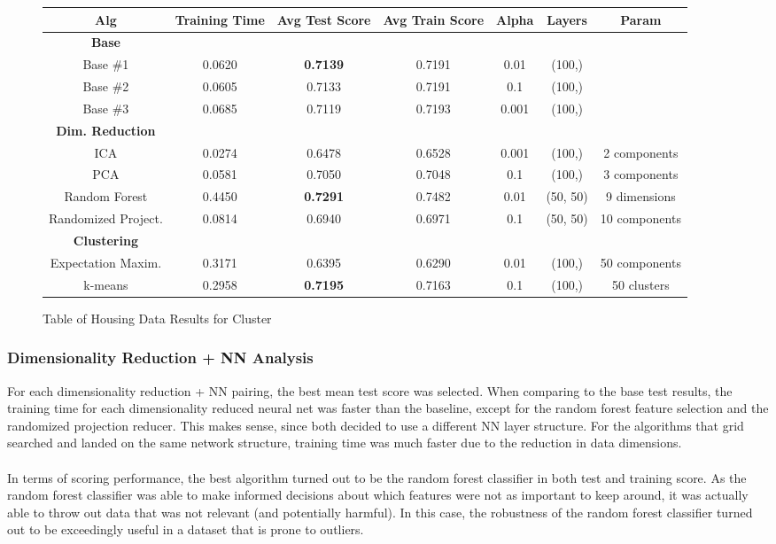 \documentclass[h]{article}
\begin{document}
\begin{figure}[H] 
\begin{tabular}{ | c | c  | c | c | c | c | c | } 
\hline
\textbf{ Alg } & \textbf{ Training Time } & \textbf{ Avg Test Score} & \textbf{ Avg Train Score } & \textbf{Alpha} & \textbf{Layers} & \textbf{Param}    \\
\hline
\textbf{Base} \\ \hline
Base \#1 & 0.0620 & \textbf{0.7139} & 0.7191 & 0.01 & (100,) \\ \hline 
Base \#2 & 0.0605 & 0.7133 & 0.7191 & 0.1 & (100,) \\ \hline 
Base \#3 & 0.0685 & 0.7119 & 0.7193 & 0.001 & (100,) \\ \hline 
\textbf{Dim. Reduction} \\ \hline
ICA & 0.0274 & 0.6478 & 0.6528 & 0.001 & (100,) & 2 components \\ \hline
PCA & 0.0581 & 0.7050 & 0.7048 & 0.1 & (100,) & 3 components \\ \hline
Random Forest & 0.4450 & \textbf{0.7291} & 0.7482 & 0.01 & (50, 50) & 9 dimensions \\ \hline
Randomized Project. & 0.0814 & 0.6940 & 0.6971 & 0.1 & (50, 50) & 10 components \\ \hline
\textbf{Clustering} \\ \hline
Expectation Maxim. & 0.3171 & 0.6395 & 0.6290 & 0.01 & (100,)  & 50 components \\ \hline
k-means & 0.2958 & \textbf{0.7195} & 0.7163 & 0.1 & (100,) & 50 clusters\\ \hline
\end{tabular}
\caption*{Table of Housing Data Results for Cluster } 
\end{figure}


\subsubsection*{Dimensionality Reduction + NN Analysis}
For each dimensionality reduction + NN pairing, the best mean test score was 
selected.  When comparing to the base test results, the training time for each 
dimensionality reduced neural net was faster than the baseline, except for the 
random forest feature selection and the randomized projection reducer.  This makes sense, since 
both decided to use a different NN layer structure.  For the algorithms that 
grid searched and landed on the same network structure, training time was much 
faster due to the reduction in data dimensions.
\\ \\
In terms of scoring performance, the best algorithm turned out to be the random 
forest classifier in both test and training score.  As the random forest 
classifier was able to make informed decisions about which features were not as 
important to keep around, it was actually able to throw out data that was not 
relevant (and potentially harmful).  In this case, the robustness of the random 
forest classifier turned out to be exceedingly useful in a dataset that is prone 
to outliers.
\end{document}
